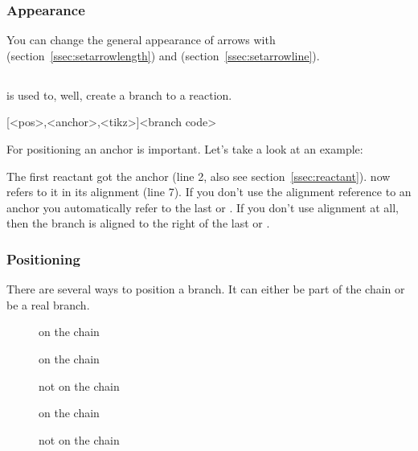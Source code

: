 \documentclass[toc=index,DIV10]{cnpkgdoc}
\begin{document}
\subsubsection{Appearance}
You can change the general appearance of arrows with 
(section~\ref{ssec:setarrowlength}) and  (section~\ref{ssec:setarrowline}).

\subsection{}\label{ssec:branch}
 is used to, well, create a branch to a reaction.
\begin{beschreibung}
 [<pos>,<anchor>,<tikz>]{<branch code>}
\end{beschreibung}
For  positioning an anchor is important. Let's take a look at an example:
\begin{beispiel}
 \begin{rxn}
  \reactant[,start]{\chemfig{-[::30]=_[::-60](-[::-60])-[::60]}}
  \chemand
 \end{rxn}
\end{beispiel}
The first reactant got the anchor  (line 2, also see
section~\ref{ssec:reactant}).  now refers to it in its alignment
(line 7). If you don't use the alignment reference to an anchor you automatically
refer to the last  or . If you don't use alignment at all,
then the branch is aligned to the right of the last  or .
\begin{beispiel}
 \begin{rxn}
  \arrow[,<=>,.5]{}{}
 \end{rxn}
\end{beispiel}

\subsubsection{Positioning}\label{sssec:branch_positionierung}
There are several ways to position a branch. It can either be part of the chain
or be a real branch.
\begin{description}
 \item[] on the chain
 \item[] on the chain
 \item[] not on the chain
 \item[] on the chain
 \item[] not on the chain
\end{description}
\end{document}
